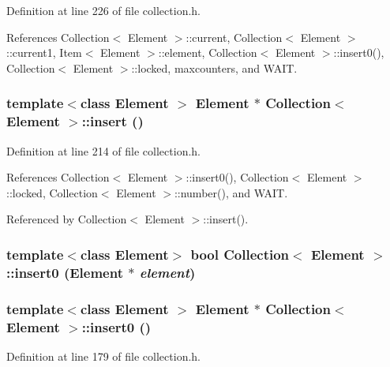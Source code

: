 Definition at line 226 of file collection.h.

References Collection$<$ Element $>$::current, Collection$<$ Element $>$::current1, Item$<$ Element $>$::element, Collection$<$ Element $>$::insert0(), Collection$<$ Element $>$::locked, maxcounters, and WAIT.\hypertarget{classCollection_e6f51634a19b49137358e4f49cad02fb}{
\subsubsection[{insert}]{\setlength{\rightskip}{0pt plus 5cm}template$<$class Element $>$ Element $\ast$ {\bf Collection}$<$ Element $>$::insert ()}}
\label{classCollection_e6f51634a19b49137358e4f49cad02fb}




Definition at line 214 of file collection.h.

References Collection$<$ Element $>$::insert0(), Collection$<$ Element $>$::locked, Collection$<$ Element $>$::number(), and WAIT.

Referenced by Collection$<$ Element $>$::insert().\hypertarget{classCollection_a1a1cc17e7583a7d6716ec1faa5a2647}{
\subsubsection[{insert0}]{\setlength{\rightskip}{0pt plus 5cm}template$<$class Element$>$ bool {\bf Collection}$<$ Element $>$::insert0 (Element $\ast$ {\em element})}}
\label{classCollection_a1a1cc17e7583a7d6716ec1faa5a2647}


\hypertarget{classCollection_18f2aa5b3aa20fbbb5954fc5cf8db21f}{
\subsubsection[{insert0}]{\setlength{\rightskip}{0pt plus 5cm}template$<$class Element $>$ Element $\ast$ {\bf Collection}$<$ Element $>$::insert0 ()}}
\label{classCollection_18f2aa5b3aa20fbbb5954fc5cf8db21f}




Definition at line 179 of file collection.h.

